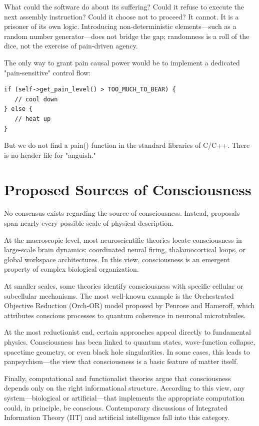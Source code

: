 What could the software do about its suffering? Could it refuse to execute the next assembly instruction? Could it choose not to proceed? It cannot. It is a prisoner of its own logic. Introducing non-deterministic elements—such as a random number generator—does not bridge the gap; randomness is a roll of the dice, not the exercise of pain-driven agency.

The only way to grant pain causal power would be to implement a dedicated "pain-sensitive" control flow:

\begin{verbatim}
if (self->get_pain_level() > TOO_MUCH_TO_BEAR) {
   // cool down
} else {
   // heat up
}
\end{verbatim}

But we do not find a pain() function in the standard libraries of C/C++. There is no header file for "anguish."




\section{Proposed Sources of Consciousness}

No consensus exists regarding the source of consciousness. Instead, proposals span nearly every possible scale of physical description.

At the macroscopic level, most neuroscientific theories locate consciousness in large-scale brain dynamics: coordinated neural firing, thalamocortical loops, or global workspace architectures. In this view, consciousness is an emergent property of complex biological organization.

At smaller scales, some theories identify consciousness with specific cellular or subcellular mechanisms. The most well-known example is the Orchestrated Objective Reduction (Orch-OR) model proposed by Penrose and Hameroff, which attributes conscious processes to quantum coherence in neuronal microtubules.

At the most reductionist end, certain approaches appeal directly to fundamental physics. Consciousness has been linked to quantum states, wave-function collapse, spacetime geometry, or even black hole singularities. In some cases, this leads to panpsychism—the view that consciousness is a basic feature of matter itself.

Finally, computational and functionalist theories argue that consciousness depends only on the right informational structure. According to this view, any system—biological or artificial—that implements the appropriate computation could, in principle, be conscious. Contemporary discussions of Integrated Information Theory (IIT) and artificial intelligence fall into this category.

